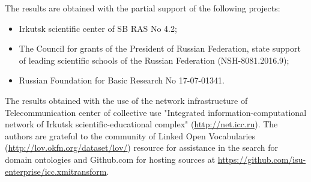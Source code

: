 \documentclass[runningheads]{llncs}
\begin{document}
The results are obtained with the partial support of the following projects:
\begin{itemize}
\item Irkutsk scientific center of SB RAS No 4.2;
\item The Council for grants of the President of Russian Federation, state support of leading scientific schools of the Russian Federation (NSH-8081.2016.9);
\item Russian Foundation for Basic Research No 17-07-01341.
\end{itemize}
The results obtained with the use of the network infrastructure of Telecommunication center of collective use "Integrated information-computational network of Irkutsk scientific-educational complex" (\url{http://net.icc.ru}). The authors are grateful to the community of Linked Open Vocabularies (\url{http://lov.okfn.org/dataset/lov/}) resource for assistance in the search for domain ontologies and Github.com for hosting sources at \url{https://github.com/isu-enterprise/icc.xmitransform}.
\end{document}
